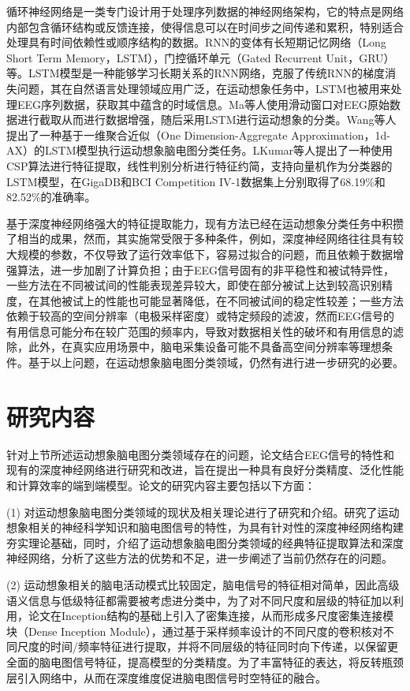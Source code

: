 循环神经网络是一类专门设计用于处理序列数据的神经网络架构，它的特点是网络内部包含循环结构或反馈连接，使得信息可以在时间步之间传递和累积，特别适合处理具有时间依赖性或顺序结构的数据。RNN的变体有长短期记忆网络（Long Short Term Memory，LSTM），门控循环单元（Gated Recurrent Unit，GRU）等。LSTM模型是一种能够学习长期关系的RNN网络，克服了传统RNN的梯度消失问题，其在自然语言处理领域应用广泛，在运动想象任务中，LSTM也被用来处理EEG序列数据，获取其中蕴含的时域信息。Ma等人\cite{ma2018improving}使用滑动窗口对EEG原始数据进行截取从而进行数据增强，随后采用LSTM进行运动想象的分类。Wang等人\cite{wang2018lstm}提出了一种基于一维聚合近似（One Dimension-Aggregate Approximation，1d-AX）的LSTM模型执行运动想象脑电图分类任务。LKumar等人\cite{kumar2019brain}提出了一种使用CSP算法进行特征提取，线性判别分析进行特征约简，支持向量机作为分类器的LSTM模型，在GigaDB\cite{cho2017eeg}和BCI Competition IV-1\cite{blankertz2007non}数据集上分别取得了68.19\%和82.52\%的准确率。

基于深度神经网络强大的特征提取能力，现有方法已经在运动想象分类任务中积攒了相当的成果，然而，其实施常受限于多种条件，例如，深度神经网络往往具有较大规模的参数，不仅导致了运行效率低下，容易过拟合的问题，而且依赖于数据增强算法，进一步加剧了计算负担；由于EEG信号固有的非平稳性和被试特异性，一些方法在不同被试间的性能表现差异较大，即使在部分被试上达到较高识别精度，在其他被试上的性能也可能显著降低，在不同被试间的稳定性较差；一些方法依赖于较高的空间分辨率（电极采样密度）或特定频段的滤波，然而EEG信号的有用信息可能分布在较广范围的频率内，导致对数据相关性的破坏和有用信息的滤除，此外，在真实应用场景中，脑电采集设备可能不具备高空间分辨率等理想条件。基于以上问题，在运动想象脑电图分类领域，仍然有进行进一步研究的必要。

\section{研究内容}

针对上节所述运动想象脑电图分类领域存在的问题，论文结合EEG信号的特性和现有的深度神经网络进行研究和改进，旨在提出一种具有良好分类精度、泛化性能和计算效率的端到端模型。论文的研究内容主要包括以下方面：

(1) 对运动想象脑电图分类领域的现状及相关理论进行了研究和介绍。研究了运动想象相关的神经科学知识和脑电图信号的特性，为具有针对性的深度神经网络构建夯实理论基础，同时，介绍了运动想象脑电图分类领域的经典特征提取算法和深度神经网络，分析了这些方法的优势和不足，进一步阐述了当前仍然存在的问题。

(2) 运动想象相关的脑电活动模式比较固定，脑电信号的特征相对简单，因此高级语义信息与低级特征都需要被考虑进分类中，为了对不同尺度和层级的特征加以利用，论文在Inception结构的基础上引入了密集连接，从而形成多尺度密集连接模块（Dense Inception Module），通过基于采样频率设计的不同尺度的卷积核对不同尺度的时间/频率特征进行提取，并将不同层级的特征同时向下传递，以保留更全面的脑电图信号特征，提高模型的分类精度。为了丰富特征的表达，将反转瓶颈层引入网络中，从而在深度维度促进脑电图信号时空特征的融合。

